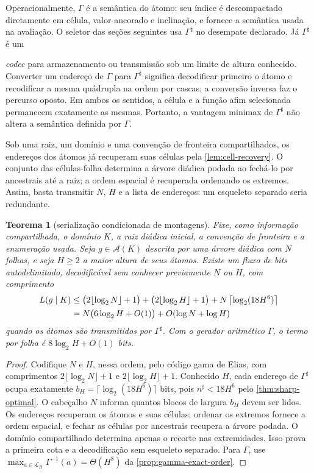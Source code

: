 \documentclass[11pt,a4paper]{article}
\newtheorem{theorem}{Teorema}[section]
\theoremstyle{definition}
\theoremstyle{remark}
\newcommand{\Aclass}{\mathcal{A}}
\newcommand{\Library}{\mathcal{L}}
\begin{document}
Operacionalmente, $\Gamma$ é a semântica do átomo: seu índice é descompactado
diretamente em célula, valor ancorado e inclinação, e fornece a semântica usada na avaliação. O seletor das seções seguintes usa $\Gamma^\sharp$ no desempate declarado. Já $\Gamma^\sharp$ é um

\emph{codec} para armazenamento ou transmissão sob um limite de altura
conhecido. Converter um endereço de $\Gamma$ para $\Gamma^\sharp$ significa
decodificar primeiro o átomo e recodificar a mesma quádrupla na ordem por
cascas; a conversão inversa faz o percurso oposto. Em ambos os sentidos, a
célula e a função afim selecionada permanecem exatamente as mesmas. Portanto,
a vantagem minimax de $\Gamma^\sharp$ não altera a semântica definida por
$\Gamma$.

Sob uma raiz, um domínio e uma convenção de fronteira compartilhados, os
endereços dos átomos já recuperam suas células pela
\cref{lem:cell-recovery}. O conjunto das células-folha determina a árvore
diádica podada ao fechá-lo por ancestrais até a raiz; a ordem espacial é
recuperada ordenando os extremos. Assim, basta transmitir $N$, $H$ e a lista
de endereços: um esqueleto separado seria redundante.

\begin{theorem}[serialização condicionada de montagens]\label{thm:assembly-serialization}
Fixe, como informação compartilhada, o domínio $K$, a raiz diádica inicial,
a convenção de fronteira e a enumeração usada. Seja $g\in\Aclass(K)$ descrita
por uma árvore diádica com $N$ folhas, e seja $H\ge2$ a maior altura de seus
átomos. Existe um fluxo de bits autodelimitado, decodificável sem conhecer
previamente $N$ ou $H$, com comprimento
\begin{align}
 L(g\mid K)
 &\le \bigl(2\lfloor\log_2N\rfloor+1\bigr)
      +\bigl(2\lfloor\log_2H\rfloor+1\bigr)
      +N\left\lceil\log_2(18H^6)\right\rceil \notag\\
 &=N\bigl(6\log_2H+O(1)\bigr)+O(\log N+\log H)
 \label{eq:assembly-bitrate}
\end{align}
quando os átomos são transmitidos por $\Gamma^\sharp$. Com o gerador
aritmético $\Gamma$, o termo por folha é $8\log_2H+O(1)$ bits.
\end{theorem}

\begin{proof}
Codifique $N$ e $H$, nessa ordem, pelo código gama de Elias, com comprimentos
$2\lfloor\log_2N\rfloor+1$ e
$2\lfloor\log_2H\rfloor+1$. Conhecido $H$, cada endereço de $\Gamma^\sharp$
ocupa exatamente
$b_H=\lceil\log_2(18H^6)\rceil$ bits, pois
$n^\sharp<18H^6$ pelo \cref{thm:sharp-optimal}. O cabeçalho $N$ informa
quantos blocos de largura $b_H$ devem ser lidos. Os endereços recuperam os
átomos e suas células; ordenar os extremos fornece a ordem espacial, e fechar
as células por ancestrais recupera a árvore podada. O domínio compartilhado
determina apenas o recorte nas extremidades. Isso prova a primeira cota e a
decodificação sem esqueleto separado. Para $\Gamma$, use
$\max_{a\in\Library_H}\Gamma^{-1}(a)=\Theta(H^8)$ da
\cref{prop:gamma-exact-order}.
\end{proof}
\end{document}
